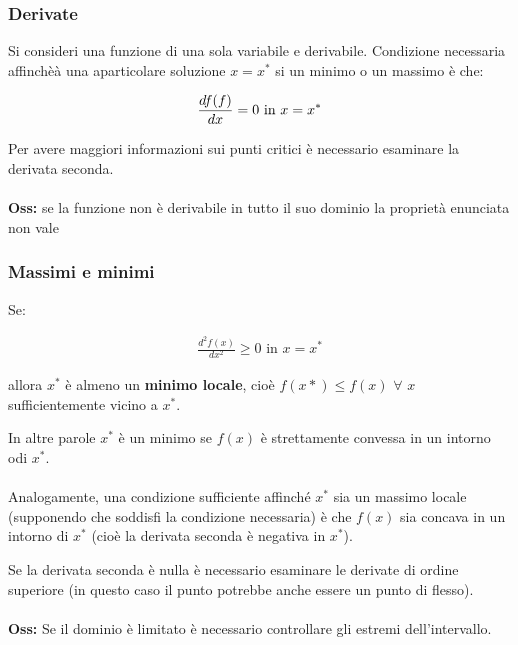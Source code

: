 \documentclass[a4paper, 11pt]{article}
\begin{document}
        \subsubsection{Derivate}
        Si consideri una funzione di una sola variabile e derivabile. Condizione necessaria affinchèà una aparticolare soluzione $x = x^*$ si un minimo o un massimo è che:

        \begin{align}
            \frac{df(f)}{dx} = 0 \text{ in $x = x^*$} \notag
        \end{align}

        Per avere maggiori informazioni sui punti critici è necessario esaminare la derivata seconda. 

        \paragraph{}
        \textbf{Oss:} se la funzione non è derivabile in tutto il suo dominio la proprietà enunciata non vale


        \subsubsection{Massimi e minimi}
        Se: 
        
        \begin{align*}
            \frac{d^2f(x)}{dx^2} \ge 0 \text{ in $x = x^*$}
        \end{align*}

        allora $x^*$ è almeno un \textbf{minimo locale}, cioè $f(x*) \le f(x)$ $\forall$ $x$ sufficientemente vicino a $x^*$. 

        In altre parole $x^*$ è un minimo se $f(x)$ è strettamente convessa in un intorno odi $x^*$.

        \paragraph{}
        Analogamente, una condizione sufficiente affinché $x^*$ sia un massimo locale (supponendo che soddisfi la condizione necessaria) è che $f(x)$ sia concava in un intorno di $x^*$ (cioè la derivata seconda è negativa in $x^*$).

        Se la derivata seconda è nulla è necessario esaminare le derivate di ordine superiore (in questo caso il punto potrebbe anche essere un
        punto di flesso).

        \paragraph{}
        \textbf{Oss: } Se il dominio è limitato è necessario controllare gli estremi dell’intervallo.
\end{document}
